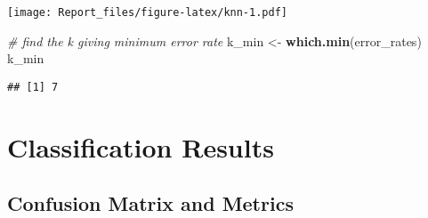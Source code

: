 \documentclass[
]{article}
\newenvironment{Shaded}{\begin{snugshade}}{\end{snugshade}}
\newcommand{\AttributeTok}[1]{\textcolor[rgb]{0.13,0.29,0.53}{#1}}
\newcommand{\CommentTok}[1]{\textcolor[rgb]{0.56,0.35,0.01}{\textit{#1}}}
\newcommand{\DecValTok}[1]{\textcolor[rgb]{0.00,0.00,0.81}{#1}}
\newcommand{\FunctionTok}[1]{\textcolor[rgb]{0.13,0.29,0.53}{\textbf{#1}}}
\newcommand{\NormalTok}[1]{#1}
\newcommand{\OtherTok}[1]{\textcolor[rgb]{0.56,0.35,0.01}{#1}}
\newcommand{\SpecialCharTok}[1]{\textcolor[rgb]{0.81,0.36,0.00}{\textbf{#1}}}
\begin{document}
\texttt{[image: Report\_files/figure-latex/knn-1.pdf]}

\begin{Shaded}
\begin{Highlighting}[]
\CommentTok{\# find the k giving minimum error rate}
\NormalTok{k\_min }\OtherTok{\textless{}{-}} \FunctionTok{which.min}\NormalTok{(error\_rates)}
\NormalTok{k\_min}
\end{Highlighting}
\end{Shaded}

\begin{verbatim}
## [1] 7
\end{verbatim}

\begin{Shaded}
\end{Shaded}

\hypertarget{classification-results}{%
\section{Classification Results}\label{classification-results}}

\hypertarget{confusion-matrix-and-metrics}{%
\subsection{Confusion Matrix and
Metrics}\label{confusion-matrix-and-metrics}}
\end{document}
